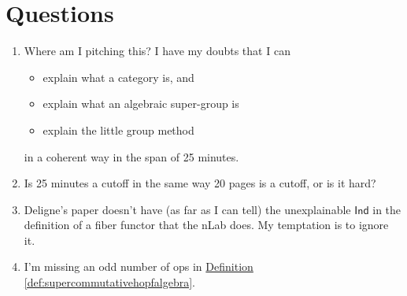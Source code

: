 \documentclass[a4paper]{report}
\theoremstyle{definition}
\theoremstyle{plain}
\theoremstyle{remark}
\begin{document}
\chapter{Questions}
\begin{enumerate}
  \item Where am I pitching this? I have my doubts that I can 
    \begin{itemize}
      \item explain what a category is, and
      \item explain what an algebraic super-group is
      \item explain the little group method
    \end{itemize}
    in a coherent way in the span of 25 minutes.

  \item Is 25 minutes a cutoff in the same way 20 pages is a cutoff, or is it hard?

  \item Deligne's paper doesn't have (as far as I can tell) the unexplainable $\mathsf{Ind}$ in the definition of a fiber functor that the nLab does. My temptation is to ignore it.

  \item I'm missing an odd number of $\text{op}$s in \hyperref[def:supercommutativehopfalgebra]{Definition \ref*{def:supercommutativehopfalgebra}}.
\end{enumerate}
\end{document}
